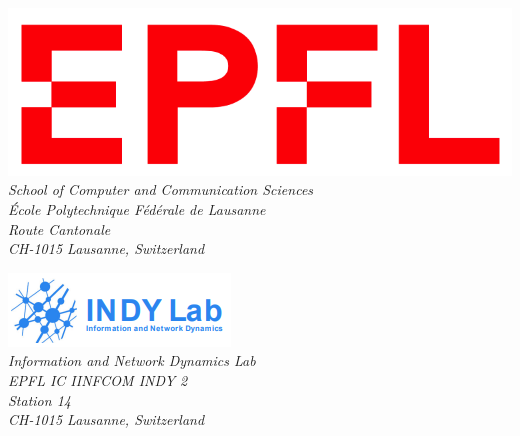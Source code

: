 \begin{titlepage}
\begin{minipage}[t]{0.5\textwidth}
    \centering
    \includegraphics[width=0.8\linewidth]{logo_epfl.png}\\[0.5cm]
    \textit{School of Computer and Communication Sciences}\\
    \textit{École Polytechnique Fédérale de Lausanne}\\
    \textit{Route Cantonale}\\
    \textit{CH-1015 Lausanne, Switzerland}
\end{minipage}%
\begin{minipage}[t]{0.5\textwidth}
    \centering
    \includegraphics[width=0.8\linewidth]{logo_indy_lab.png}\\[0.5cm]
    \textit{Information and Network Dynamics Lab}\\
    \textit{EPFL IC IINFCOM INDY 2}\\
    \textit{Station 14}\\
    \textit{CH-1015 Lausanne, Switzerland}
\end{minipage}

\vfill %

\end{titlepage}

